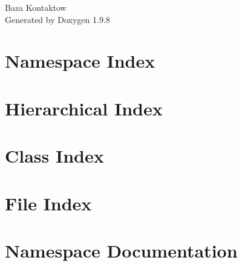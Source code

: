 \documentclass[twoside]{book}
\newcommand{\+}{\discretionary{\mbox{\scriptsize$\hookleftarrow$}}{}{}}
\newcommand{\clearemptydoublepage}{%
    \newpage{\pagestyle{empty}\cleardoublepage}%
  }
\begin{document}
  \raggedbottom
    \hypersetup{pageanchor=false,
                bookmarksnumbered=true,
                pdfencoding=unicode
               }
  \begin{titlepage}
  \vspace*{7cm}
  \begin{center}%
  {\Large Baza Kontaktow}\\
  \vspace*{1cm}
  {\large Generated by Doxygen 1.9.8}\\
  \end{center}
  \end{titlepage}
  \clearemptydoublepage
  \tableofcontents
  \clearemptydoublepage
  \hypersetup{pageanchor=true}


\chapter{Namespace Index}

\chapter{Hierarchical Index}

\chapter{Class Index}

\chapter{File Index}

\chapter{Namespace Documentation}


\end{document}
